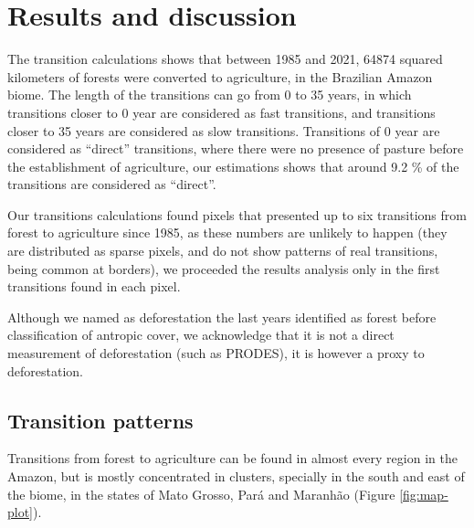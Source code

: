 \documentclass[essd, manuscript]{copernicus}
\begin{document}
\section{Results and discussion}

The transition calculations shows that between 1985 and 2021, 64874 squared kilometers of forests were converted to agriculture, in the Brazilian Amazon biome.
The length of the transitions can go from 0 to 35 years, in which transitions closer to 0 year are considered as fast transitions, and transitions closer to 35 years are considered as slow transitions.
Transitions of 0 year are considered as ``direct'' transitions, where there were no presence of pasture before the establishment of agriculture, our estimations shows that around 9.2 \% of the transitions are considered as ``direct''.

Our transitions calculations found pixels that presented up to six transitions from forest to agriculture since 1985, as these numbers are unlikely to happen (they are distributed as sparse pixels, and do not show patterns of real transitions, being common at borders), we proceeded the results analysis only in the first transitions found in each pixel.

Although we named as deforestation the last years identified as forest before classification of antropic cover, we acknowledge that it is not a direct measurement of deforestation (such as PRODES), it is however a proxy to deforestation.

\subsection{Transition patterns}

Transitions from forest to agriculture can be found in almost every region in the Amazon, but is mostly concentrated in clusters, specially in the south and east of the biome, in the states of Mato Grosso, Pará and Maranhão (Figure \ref{fig:map-plot}).
\end{document}
